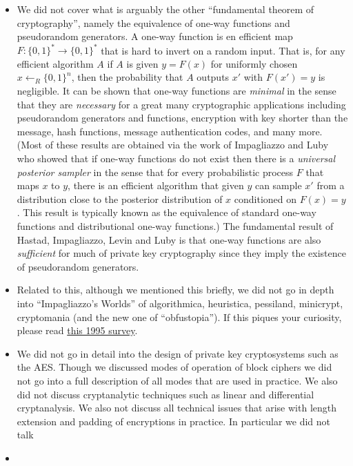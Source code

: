 \begin{itemize}
\item
  We did not cover what is arguably the other ``fundamental theorem of
  cryptography'', namely the equivalence of one-way functions and
  pseudorandom generators. A one-way function is en efficient map
  \(F:\{0,1\}^*\rightarrow\{0,1\}^*\) that is hard to invert on a random
  input. That is, for any efficient algorithm \(A\) if \(A\) is given
  \(y=F(x)\) for uniformly chosen \(x\leftarrow_R\{0,1\}^n\), then the
  probability that \(A\) outputs \(x'\) with \(F(x')=y\) is negligible.
  It can be shown that one-way functions are \emph{minimal} in the sense
  that they are \emph{necessary} for a great many cryptographic
  applications including pseudorandom generators and functions,
  encryption with key shorter than the message, hash functions, message
  authentication codes, and many more. (Most of these results are
  obtained via the work of Impagliazzo and Luby who showed that if
  one-way functions do not exist then there is a \emph{universal
  posterior sampler} in the sense that for every probabilistic process
  \(F\) that maps \(x\) to \(y\), there is an efficient algorithm that
  given \(y\) can sample \(x'\) from a distribution close to the
  posterior distribution of \(x\) conditioned on \(F(x)=y\). This result
  is typically known as the equivalence of standard one-way functions
  and distributional one-way functions.) The fundamental result of
  Hastad, Impagliazzo, Levin and Luby is that one-way functions are also
  \emph{sufficient} for much of private key cryptography since they
  imply the existence of pseudorandom generators.
\item
  Related to this, although we mentioned this briefly, we did not go in
  depth into ``Impagliazzo's Worlds'' of algorithmica, heuristica,
  pessiland, minicrypt, cryptomania (and the new one of ``obfustopia'').
  If this piques your curiosity, please read
  \href{http://www.cs.mun.ca/~kol/courses/6743-w15/papers/russell-fiveworlds.pdf}{this
  1995 survey}.
\item
  We did not go in detail into the design of private key cryptosystems
  such as the AES. Though we discussed modes of operation of block
  ciphers we did not go into a full description of all modes that are
  used in practice. We also did not discuss cryptanalytic techniques
  such as linear and differential cryptanalysis. We also not discuss all
  technical issues that arise with length extension and padding of
  encryptions in practice. In particular we did not talk
\item

\end{itemize}
